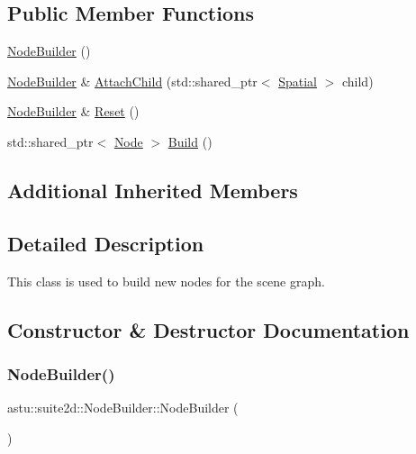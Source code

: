 \subsection*{Public Member Functions}
\begin{DoxyCompactItemize}
\item 
\hyperlink{classastu_1_1suite2d_1_1NodeBuilder_a546a7e4396fd4b639bfcfdf6210b4d18}{Node\+Builder} ()
\item 
\hyperlink{classastu_1_1suite2d_1_1NodeBuilder}{Node\+Builder} \& \hyperlink{classastu_1_1suite2d_1_1NodeBuilder_a27c7bef4a7b0206f5b348a966dd1bf65}{Attach\+Child} (std\+::shared\+\_\+ptr$<$ \hyperlink{classastu_1_1suite2d_1_1Spatial}{Spatial} $>$ child)
\item 
\hyperlink{classastu_1_1suite2d_1_1NodeBuilder}{Node\+Builder} \& \hyperlink{classastu_1_1suite2d_1_1NodeBuilder_aa4cc219e5a695416b00b860bb56f5133}{Reset} ()
\item 
std\+::shared\+\_\+ptr$<$ \hyperlink{classastu_1_1suite2d_1_1Node}{Node} $>$ \hyperlink{classastu_1_1suite2d_1_1NodeBuilder_aa6fe121083b0772242e6e38d2a109970}{Build} ()
\end{DoxyCompactItemize}
\subsection*{Additional Inherited Members}


\subsection{Detailed Description}
This class is used to build new nodes for the scene graph. 

\subsection{Constructor \& Destructor Documentation}
\mbox{\label{classastu_1_1suite2d_1_1NodeBuilder_a546a7e4396fd4b639bfcfdf6210b4d18}} 
\subsubsection{\texorpdfstring{Node\+Builder()}{NodeBuilder()}}
{\footnotesize\ttfamily astu\+::suite2d\+::\+Node\+Builder\+::\+Node\+Builder (\begin{DoxyParamCaption}{ }\end{DoxyParamCaption})\hspace{0.3cm}{\ttfamily [inline]}}

